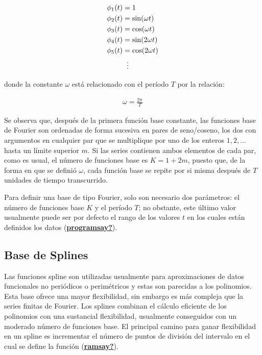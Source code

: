 \documentclass[
]{book}
\begin{document}
\begin{align}
    \phi_1(t)&=1\\
    \phi_2(t)&=\sin(\omega t)\\
    \phi_3(t)&=\cos(\omega t)\\
    \phi_4(t)&=\sin(2\omega t)\\
    \phi_5(t)&=\cos(2\omega t)\\
    & \hspace{0.2cm}\vdots
\end{align}

donde la constante \(\omega\) está relacionado con el período \(T\) por la relación:

\begin{align}
    \omega =\frac{2\pi}{T}
\end{align}

Se observa que, después de la primera función base constante, las funciones base de Fourier son ordenadas de forma sucesiva en pares de seno/coseno, los dos con argumentos en cualquier par que se multiplique por uno de los enteros \(1,2,...\) hasta un límite superior \(m\). Si las series contienen ambos elementos de cada par, como es usual, el número de funciones base es \(K=1+2m\), puesto que, de la forma en que se definió \(\omega\), cada función base se repite por si misma después de \(T\) unidades de tiempo transcurrido.

Para definir una base de tipo Fourier, solo son necesario dos parámetros: el número de funciones base \(K\) y el período \(T\); no obstante, este último valor usualmente puede ser por defecto el rango de los valores \(t\) en los cuales están definidos los datos (\protect\hyperlink{ref-programsay}{\textbf{programsay?}}).

\hypertarget{base-de-splines}{%
\subsection*{Base de Splines}\label{base-de-splines}}

Las funciones spline son utilizadas usualmente para aproximaciones de datos funcionales no periódicos o perimétricos y estas son parecidas a los polinomios. Esta base ofrece una mayor flexibilidad, sin embargo es más compleja que la series finitas de Fourier. Los splines combinan el cálculo eficiente de los polinomios con una sustancial flexibilidad, usualmente conseguidos con un moderado número de funciones base. El principal camino para ganar flexibilidad en un spline es incrementar el número de puntos de división del intervalo en el cual se define la función (\protect\hyperlink{ref-ramsay}{\textbf{ramsay?}}).
\end{document}
